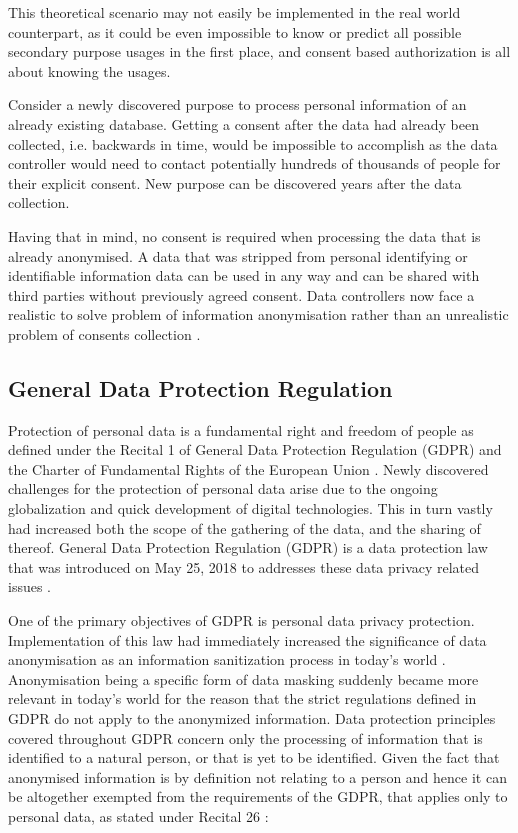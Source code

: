 \documentclass[a4paper,twoside,12pt]{book}
\begin{document}
This theoretical scenario may not easily be implemented in the real world counterpart, as it could be even impossible to know or predict all possible secondary purpose usages in the first place, and consent based authorization is all about knowing the usages.

Consider a newly discovered purpose to process personal information of an already existing database. Getting a consent after the data had already been collected, i.e. backwards in time, would be impossible to accomplish as the data controller would need to contact potentially hundreds of thousands of people for their explicit consent. New purpose can be discovered years after the data collection.

Having that in mind, no consent is required when processing the data that is already anonymised. A data that was stripped from personal identifying or identifiable information data can be used in any way and can be shared with third parties without previously agreed consent. Data controllers now face a realistic to solve problem of information anonymisation rather than an unrealistic problem of consents collection \cite{bib:anonymizing_health_data}.

\subsection{General Data Protection Regulation}

Protection of personal data is a fundamental right and freedom of people as defined under the Recital 1 of General Data Protection Regulation (GDPR) and the Charter of Fundamental Rights of the European Union \cite{bib:recital1}\cite{bib:charter}. Newly discovered challenges for the protection of personal data arise due to the ongoing globalization and quick development of digital technologies. This in turn vastly had increased both the scope of the gathering of the data, and the sharing of thereof. General Data Protection Regulation (GDPR) is a data protection law that was introduced on May 25, 2018 to addresses these data privacy related issues \cite{bib:recital6}.

One of the primary objectives of GDPR is personal data privacy protection. Implementation of this law had immediately increased the significance of data anonymisation as an information sanitization process in today's world \cite{bib:anonymization_for_research}. Anonymisation being a specific form of data masking suddenly became more relevant in today's world for the reason that the strict regulations defined in GDPR do not apply to the anonymized information. Data protection principles covered throughout GDPR concern only the processing of information that is identified to a natural person, or that is yet to be identified. Given the fact that anonymised information is by definition not relating to a person and hence it can be altogether exempted from the requirements of the GDPR, that applies only to personal data, as stated under Recital 26 \cite{bib:recital26}:
\end{document}
